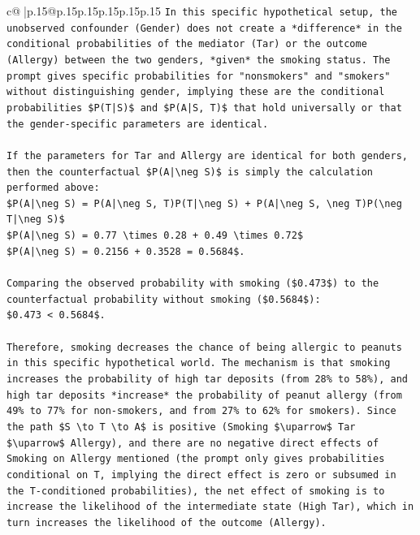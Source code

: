 \documentclass{article}
\begin{document}
{\begin{supertabular}{c@{$\;$}|p{.15\linewidth}@{}p{.15\linewidth}p{.15\linewidth}p{.15\linewidth}p{.15\linewidth}p{.15\linewidth}}
{{{\texttt{In this specific hypothetical setup, the unobserved confounder (Gender) does not create a *difference* in the conditional probabilities of the mediator (Tar) or the outcome (Allergy) between the two genders, *given* the smoking status. The prompt gives specific probabilities for "nonsmokers" and "smokers" without distinguishing gender, implying these are the conditional probabilities \$P(T|S)\$ and \$P(A|S, T)\$ that hold universally or that the gender{-}specific parameters are identical.} \\
\\ 
\texttt{If the parameters for Tar and Allergy are identical for both genders, then the counterfactual \$P(A|\textbackslash{}neg S)\$ is simply the calculation performed above:} \\
\texttt{\$P(A|\textbackslash{}neg S) = P(A|\textbackslash{}neg S, T)P(T|\textbackslash{}neg S) + P(A|\textbackslash{}neg S, \textbackslash{}neg T)P(\textbackslash{}neg T|\textbackslash{}neg S)\$} \\
\texttt{\$P(A|\textbackslash{}neg S) = 0.77 \textbackslash{}times 0.28 + 0.49 \textbackslash{}times 0.72\$} \\
\texttt{\$P(A|\textbackslash{}neg S) = 0.2156 + 0.3528 = 0.5684\$.} \\
\\ 
\texttt{Comparing the observed probability with smoking (\$0.473\$) to the counterfactual probability without smoking (\$0.5684\$):} \\
\texttt{\$0.473 < 0.5684\$.} \\
\\ 
\texttt{Therefore, smoking decreases the chance of being allergic to peanuts in this specific hypothetical world. The mechanism is that smoking increases the probability of high tar deposits (from 28\% to 58\%), and high tar deposits *increase* the probability of peanut allergy (from 49\% to 77\% for non{-}smokers, and from 27\% to 62\% for smokers). Since the path \$S \textbackslash{}to T \textbackslash{}to A\$ is positive (Smoking \$\textbackslash{}uparrow\$ Tar \$\textbackslash{}uparrow\$ Allergy), and there are no negative direct effects of Smoking on Allergy mentioned (the prompt only gives probabilities conditional on T, implying the direct effect is zero or subsumed in the T{-}conditioned probabilities), the net effect of smoking is to increase the likelihood of the intermediate state (High Tar), which in turn increases the likelihood of the outcome (Allergy).} \\
\\ 
}}}
\end{supertabular}}
\end{document}
